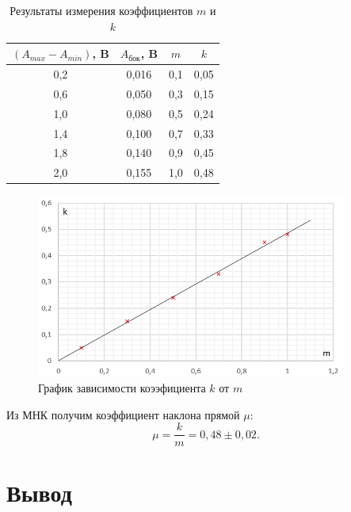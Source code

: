 \documentclass[a4paper]{article}
\theoremstyle{definition}
\theoremstyle{remark}
\begin{document}
\begin{table}[h!]
    \centering
    \begin{tabular}{|c|c|c|c|}
    \hline
    $(A_{max} - A_{min})$, B & $A_{\text{бок}}$, B      &  $m$   &   $k$   \\ \hline
    0,2 & 0,016 & 0,1 & 0,05 \\ \hline
    0,6 & 0,050 & 0,3 & 0,15 \\ \hline
    1,0 & 0,080 & 0,5 & 0,24 \\ \hline
    1,4 & 0,100 & 0,7 & 0,33 \\ \hline
    1,8 & 0,140 & 0,9 & 0,45 \\ \hline
    2,0 & 0,155 & 1,0 & 0,48 \\ \hline
    \end{tabular}
    \caption{Результаты измерения коэффициентов $m$ и $k$}
    \end{table}

    \begin{figure}[t]
        \centering
        \includegraphics[width = 290pt]{image/graph3.png}
        \caption{График зависимости коээфициента $k$ от $m$}
    \end{figure}

\noindent Из МНК получим коэффициент наклона прямой $\mu$: $$\mu = \frac{k}{m} = 0,48 \pm 0,02.$$

\section{Вывод}
\end{document}
